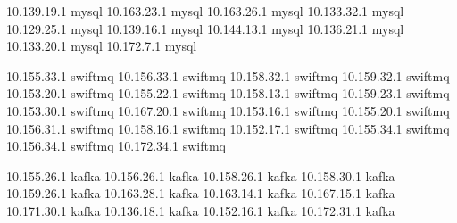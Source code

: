 10.139.19.1    mysql
10.163.23.1    mysql
10.163.26.1    mysql
10.133.32.1    mysql
10.129.25.1    mysql
10.139.16.1    mysql
10.144.13.1    mysql
10.136.21.1    mysql
10.133.20.1    mysql
10.172.7.1     mysql

10.155.33.1    swiftmq
10.156.33.1    swiftmq
10.158.32.1    swiftmq
10.159.32.1    swiftmq
10.153.20.1    swiftmq
10.155.22.1    swiftmq
10.158.13.1    swiftmq
10.159.23.1    swiftmq
10.153.30.1    swiftmq
10.167.20.1    swiftmq
10.153.16.1    swiftmq
10.155.20.1    swiftmq
10.156.31.1    swiftmq
10.158.16.1    swiftmq
10.152.17.1    swiftmq
10.155.34.1    swiftmq
10.156.34.1    swiftmq
10.172.34.1    swiftmq

10.155.26.1   kafka
10.156.26.1   kafka
10.158.26.1   kafka
10.158.30.1   kafka
10.159.26.1   kafka
10.163.28.1   kafka
10.163.14.1   kafka
10.167.15.1   kafka
10.171.30.1   kafka
10.136.18.1   kafka
10.152.16.1   kafka
10.172.31.1   kafka

